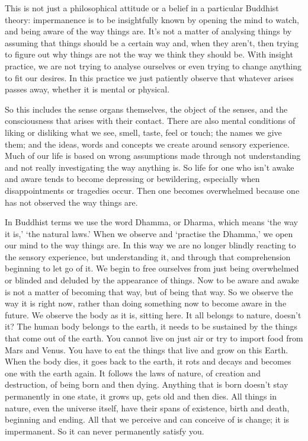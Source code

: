 This is not just a philosophical attitude or a belief in a particular Buddhist theory: impermanence is to be insightfully known by opening the mind to watch, and being aware of the way things are. It's not a matter of analysing things by assuming that things should be a certain way and, when they aren't, then trying to figure out why things are not the way we think they should be. With insight practice, we are not trying to analyse ourselves or even trying to change anything to fit our desires. In this practice we just patiently observe that whatever arises passes away, whether it is mental or physical.

So this includes the sense organs themselves, the object of the senses, and the consciousness that arises with their contact. There are also mental conditions of liking or disliking what we see, smell, taste, feel or touch; the names we give them; and the ideas, words and concepts we create around sensory experience. Much of our life is based on wrong assumptions made through not understanding and not really investigating the way anything is. So life for one who isn't awake and aware tends to become depressing or bewildering, especially when disappointments or tragedies occur. Then one becomes overwhelmed because one has not observed the way things are.

In Buddhist terms we use the word Dhamma, or Dharma, which means `the way it is,' `the natural laws.' When we observe and `practise the Dhamma,' we open our mind to the way things are. In this way we are no longer blindly reacting to the sensory experience, but understanding it, and through that comprehension beginning to let go of it. We begin to free ourselves from just being overwhelmed or blinded and deluded by the appearance of things. Now to be aware and awake is not a matter of becoming that way, but of being that way. So we observe the way it is right now, rather than doing something now to become aware in the future. We observe the body as it is, sitting here. It all belongs to nature, doesn't it? The human body belongs to the earth, it needs to be sustained by the things that come out of the earth. You cannot live on just air or try to import food from Mars and Venus. You have to eat the things that live and grow on this Earth. When the body dies, it goes back to the earth, it rots and decays and becomes one with the earth again. It follows the laws of nature, of creation and destruction, of being born and then dying. Anything that is born doesn't stay permanently in one state, it grows up, gets old and then dies. All things in nature, even the universe itself, have their spans of existence, birth and death, beginning and ending. All that we perceive and can conceive of is change; it is impermanent. So it can never permanently satisfy you.

